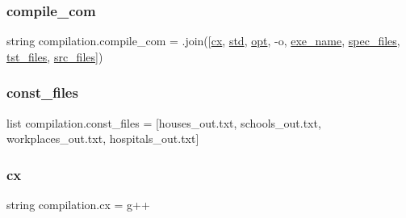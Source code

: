\subsubsection{\texorpdfstring{compile\+\_\+com}{compile\_com}}
{\footnotesize\ttfamily string compilation.\+compile\+\_\+com = \textquotesingle{} \textquotesingle{}.join(\mbox{[}\hyperlink{namespacecompilation_ad0f846bbbc95dcce53b9f00d8c807571}{cx}, \hyperlink{namespacecompilation_a762bca1fba31c18bcb62094e66cd2aa2}{std}, \hyperlink{namespacecompilation_a57efc23010b24292a9208b55ff35c3e8}{opt}, \textquotesingle{}-\/o\textquotesingle{}, \hyperlink{namespacecompilation_afbfcd1e8d9e1c7a3d1bed4a27abe8b72}{exe\+\_\+name}, \hyperlink{namespacecompilation_a7870c1a877bc1c9cb395aa9fb1c25982}{spec\+\_\+files}, \hyperlink{namespacecompilation_afc391618d31035167addaa7c490b4b83}{tst\+\_\+files}, \hyperlink{namespacecompilation_a10d70893afdbc9620e6bd6d4b65b263c}{src\+\_\+files}\mbox{]})}

\mbox{\label{namespacecompilation_a8cabbc261586d969f95f53439b9c7f06}} 
\subsubsection{\texorpdfstring{const\+\_\+files}{const\_files}}
{\footnotesize\ttfamily list compilation.\+const\+\_\+files = \mbox{[}\textquotesingle{}houses\+\_\+out.\+txt\textquotesingle{}, \textquotesingle{}schools\+\_\+out.\+txt\textquotesingle{}, \textquotesingle{}workplaces\+\_\+out.\+txt\textquotesingle{}, \textquotesingle{}hospitals\+\_\+out.\+txt\textquotesingle{}\mbox{]}}

\mbox{\label{namespacecompilation_ad0f846bbbc95dcce53b9f00d8c807571}} 
\subsubsection{\texorpdfstring{cx}{cx}}
{\footnotesize\ttfamily string compilation.\+cx = \textquotesingle{}g++\textquotesingle{}}

\mbox{\label{namespacecompilation_a9a1debd6f944e917f85b5a30295869e0}} 
